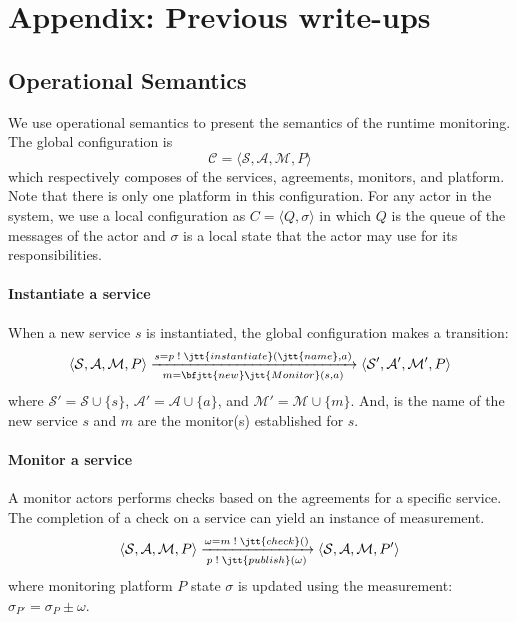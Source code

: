 
\appendix
\label{appendix}

\newpage

\section{Appendix: Previous write-ups}


\subsection{Operational Semantics} %
\label{sub:operational_semantics}
We use operational semantics to present the semantics of the runtime monitoring. 
The global configuration is
$$
\mathcal{C} = \langle \mathcal{S}, \mathcal{A}, \mathcal{M}, P \rangle
$$
which respectively composes of the services, agreements, monitors, and platform.
Note that there is only one platform in this configuration.
For any actor in the system, we use a local configuration as $C = \langle Q, \sigma \rangle$ in which $Q$ is the queue of the messages of the actor and $\sigma$ is a local state that the actor may use for its responsibilities.

\paragraph{Instantiate a service} 
When a new service $s$ is instantiated, the global configuration makes a transition:
\[
\langle \mathcal{S}, \mathcal{A}, \mathcal{M}, P \rangle
\xrightarrow[m = \bfjtt{new} \jtt{ Monitor}(s, a)]{s=p \; ! \; \jtt{instantiate}(\jtt{name}, a)}
\langle \mathcal{S'}, \mathcal{A'}, \mathcal{M'}, P \rangle
 \\
\]
where $\mathcal{S'} = \mathcal{S} \cup \{s\}$, $\mathcal{A'} = \mathcal{A} \cup \{a\}$, and $\mathcal{M'} = \mathcal{M} \cup \{m\}$.
And,  is the name of the new service $s$ and $m$ are the monitor(s) established for $s$.

\paragraph{Monitor a service}
A monitor actors performs checks based on the agreements for a specific service.
The completion of a check on a service can yield an instance of measurement.
\[
\langle \mathcal{S}, \mathcal{A}, \mathcal{M}, P \rangle
\xrightarrow[p \; ! \; \jtt{publish}(\omega)]{\omega = m \; ! \; \jtt{check}()}
\langle \mathcal{S}, \mathcal{A}, \mathcal{M}, P' \rangle
\]
where monitoring platform $P$ state $\sigma$ is updated using the measurement: $\sigma_{P'} = \sigma_{P} \pm \omega$.

